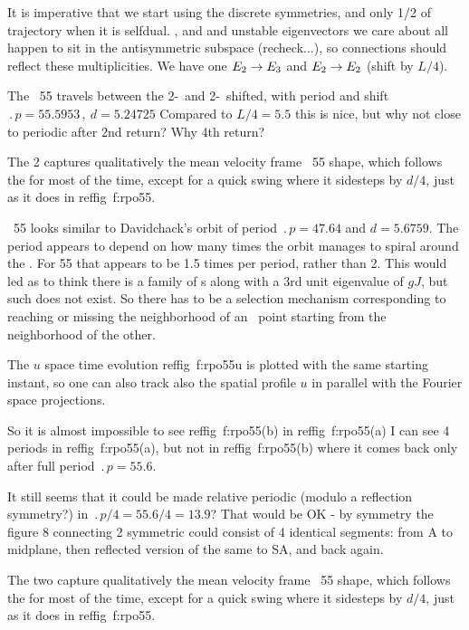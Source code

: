 It is imperative that we start using the discrete symmetries, and only 1/2
of trajectory when it is selfdual.
,  and  and unstable eigenvectors
we care about all happen to sit in the antisymmetric subspace
(recheck...), so connections should reflect these multiplicities. We have
one $E_{2} \to E_{3}$ and $E_{2} \to E_{2}$ (shift by $L/4$).

The \rpo\ {\nameit}55 travels between the 2-\eqv\  and
2-\eqv\ shifted,
with period and shift
$\period{p}=55.5953\,,\ d=5.24725$
Compared to $L/4 = 5.5$
this is nice, but why not close to periodic after 2nd return? Why 4th return?

The {\nameit}2 {\eqv}
captures qualitatively the mean velocity frame \rpo\ {\nameit}55 shape,
which follows the
{\eqv} for most of the time, except for a quick swing where it
sidesteps by $d/4$, just as it does in reffig~{f:rpo55}.

\Rpo\ {\nameit}55 looks similar to Davidchack's  orbit
of period
$\period{p}=47.64$ and $d=5.6759$. The period appears to depend on how
many times the orbit manages to spiral around the \eqv.
For {\nameit}55 that appears to be
1.5 times per period, rather than 2. This would led as
to
think there is a family of \rpo s along with a 3rd unit eigenvalue of
$gJ$,
but such does not exist.
So there has to be a selection mechanism corresponding to
reaching or missing the neighborhood of an \eqv\  point starting from
the neighborhood of the other.

The $u$ space time evolution reffig~{f:rpo55u} %
is plotted with the same starting instant,
so one can also track also the spatial profile $u$ in parallel with
the Fourier space projections.

So it is almost impossible to see reffig~{f:rpo55}(b) %
in reffig~{f:rpo55}(a) %
I can see 4 periods in reffig~{f:rpo55}(a), %
but not in reffig~{f:rpo55}(b) %
where it comes back only after full period $\period{p}=55.6$.

It still seems that it could be made relative periodic
(modulo a reflection symmetry?)
in $\period{p}/4=55.6/4=13.9$? That would be OK
-
by symmetry the figure 8 connecting
2 symmetric {\eqva} could consist of 4 identical segments: from
{\eqv} A to midplane, then reflected version of the same to SA, and
back again.

The two {\eqva}
capture qualitatively the mean velocity frame \rpo\ {\nameit}55 shape,
which follows the
{\eqv} for most of the time, except for a quick swing where it
sidesteps by $d/4$, just as it does in reffig~{f:rpo55}.

